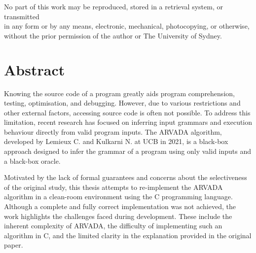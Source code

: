 \onehalfspacing

\restoregeometry
\onehalfspacing

\clearpage\null\thispagestyle{empty}
\begin{center}
    \vspace*{\fill}
    
    
    No part of this work may be reproduced, stored in a retrieval system, or transmitted \\
    in any form or by any means, electronic, mechanical, photocopying, or otherwise, \\
    without the prior permission of the author or The University of Sydney.
\end{center}

\chapter*{Abstract}
Knowing the source code of a program greatly aids program comprehension, testing, optimisation, and debugging. However, due to various restrictions and other external factors, accessing source code is often not possible. To address this limitation, recent research has focused on inferring input grammars and execution behaviour directly from valid program inputs. The ARVADA algorithm, developed by Lemieux C. and Kulkarni N. at UCB in 2021, is a black-box approach designed to infer the grammar of a program using only valid inputs and a black-box oracle.

Motivated by the lack of formal guarantees and concerns about the selectiveness of the original study, this thesis attempts to re-implement the ARVADA algorithm in a clean-room environment using the C programming language. Although a complete and fully correct implementation was not achieved, the work highlights the challenges faced during development. These include the inherent complexity of ARVADA, the difficulty of implementing such an algorithm in C, and the limited clarity in the explanation provided in the original paper.


\newpage\thispagestyle{empty}
\tableofcontents


